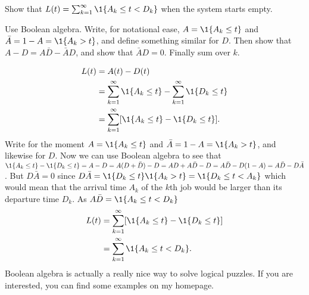 \begin{exercise}
 Show that $L(t) = \sum_{k=1}^\infty \1{A_k \leq t < D_k}$ when the system starts empty.
\begin{hint}
 Use Boolean algebra.
 Write, for notational ease, $A=\1{A_k \leq t}$ and $\bar A = 1- A = \1{A_k > t}$, and define something similar for $D$.
 Then show that $A - D = A \bar D - \bar A D$, and show that $\bar A D =0$.
 Finally sum over $k$.
\end{hint}

\begin{solution}
 \begin{equation*}
 \begin{split}
 L(t)
&= A(t) - D(t) \\
&= \sum_{k=1}^\infty \1{A_k \leq t} - \sum_{k=1}^\infty \1{D_k \leq t} \\
&= \sum_{k=1}^\infty [\1{A_k \leq t} - \1{D_k \leq t}].
 \end{split}
 \end{equation*}
 Write for the moment $A=\1{A_k \leq t}$ and
 $\bar A = 1- A = \1{A_k > t}$, and likewise for $D$. Now we can use
 Boolean algebra to see that
 $\1{A_k \leq t} - \1{D_k \leq t} = A-D = A(D+\bar D) -D = AD +
 A\bar D - D = A\bar D - D(1-A) = A\bar D - D \bar A$.
 But $D \bar A = 0$ since
 $D \bar A = \1{D_k \leq t} \1{A_k > t} = \1{D_k \leq t < A_k}$
 which would mean that the arrival time $A_k$ of the $k$th job would
 be larger than its departure time $D_k$. As $A \bar D = \1{A_k \leq t < D_k}$
 \begin{equation*}
 \begin{split}
 L(t)
&= \sum_{k=1}^\infty [\1{A_k \leq t} - \1{D_k \leq t}] \\
&= \sum_{k=1}^\infty \1{A_k \leq t < D_k}.
 \end{split}
 \end{equation*}
 Boolean algebra is actually a really nice way to solve logical puzzles.
 If you are interested, you can find some examples on my homepage.
\end{solution}

\end{exercise}

